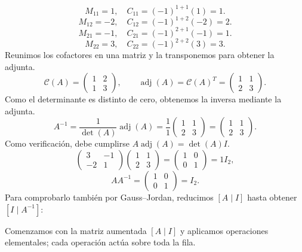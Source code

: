 \documentclass[12pt]{article}
\theoremstyle{remark}
\newcommand{\adj}{\operatorname{adj}}
\begin{document}
\[
M_{11}=1,\quad C_{11}=(-1)^{1+1}(1)=1.
\]
\[
M_{12}=-2,\quad C_{12}=(-1)^{1+2}(-2)=2.
\]
\[
M_{21}=-1,\quad C_{21}=(-1)^{2+1}(-1)=1.
\]
\[
M_{22}=3,\quad C_{22}=(-1)^{2+2}(3)=3.
\]
Reunimos los cofactores en una matriz y la transponemos para obtener la adjunta.
\[
\mathcal{C}(A)=\begin{pmatrix}1&2\\1&3\end{pmatrix},\qquad\adj(A)=\mathcal{C}(A)^T=\begin{pmatrix}1&1\\2&3\end{pmatrix}.
\]
Como el determinante es distinto de cero, obtenemos la inversa mediante la adjunta.
\[
A^{-1}=\frac1{\det(A)}\adj(A)=\frac1{1}\begin{pmatrix}1&1\\2&3\end{pmatrix}=\begin{pmatrix}1&1\\2&3\end{pmatrix}.
\]
Como verificación, debe cumplirse $A\adj(A)=\det(A)I$.
\[
\begin{pmatrix}3&-1\\-2&1\end{pmatrix}\begin{pmatrix}1&1\\2&3\end{pmatrix}=\begin{pmatrix}1&0\\0&1\end{pmatrix}=1I_{2},
\]
\[
AA^{-1}=\begin{pmatrix}1&0\\0&1\end{pmatrix}=I_{2}.
\]
Para comprobarlo también por Gauss--Jordan, reducimos $[A\mid I]$ hasta obtener $[I\mid A^{-1}]$:

Comenzamos con la matriz aumentada $[A\mid I]$ y aplicamos operaciones elementales; cada operación actúa sobre toda la fila.
\end{document}
